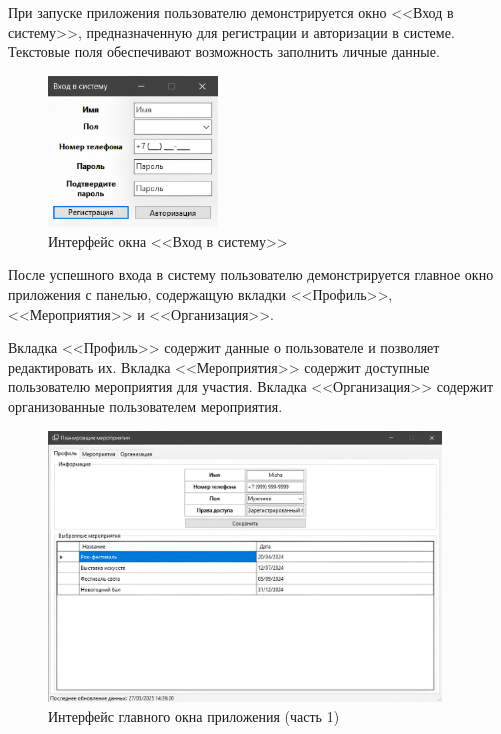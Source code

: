 При запуске приложения пользователю демонстрируется окно <<Вход в систему>>, предназначенную для регистрации и авторизации в системе. Текстовые поля обеспечивают возможность заполнить личные данные.

\newpage

\begin{figure}[h!]
	\centering
	\includegraphics[width=0.4\textwidth]{images/app-enter.png}
	\caption{Интерфейс окна <<Вход в систему>>} 
	\label{fig:app-enter} 
\end{figure}

После успешного входа в систему пользователю демонстрируется главное окно приложения с панелью, содержащую вкладки <<Профиль>>, <<Мероприятия>> и <<Организация>>. 

Вкладка <<Профиль>> содержит данные о пользователе и позволяет редактировать их. Вкладка <<Мероприятия>> содержит доступные пользователю мероприятия для участия. Вкладка <<Организация>> содержит организованные пользователем мероприятия.

\begin{figure}[h!]
	\centering
	\includegraphics[width=0.93\textwidth]{images/mainwindow-1.png}
	\caption{Интерфейс главного окна приложения (часть 1)} 
	\label{fig:app-mainwindow-1} 
\end{figure}

